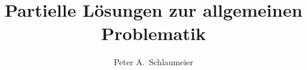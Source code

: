 \documentclass[bachelor,german,smartquotes]{hgbthesis}
\title{Partielle Lösungen zur allgemeinen Problematik}
\author{Peter A.\ Schlaumeier}
\begin{document}

\frontmatter                    %

\maketitle
\tableofcontents

		
			

\mainmatter          %










\appendix                                            %


\MakeBibliography                        %



\end{document}
